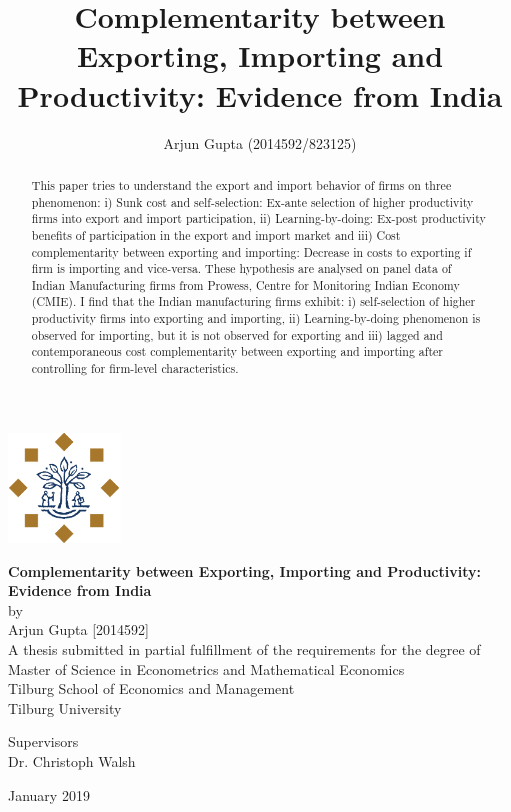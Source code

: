 \documentclass[12pt]{article}
\title{Complementarity between Exporting, Importing and Productivity: Evidence from India}
\author{Arjun Gupta (2014592/823125)}
\begin{document}

\begin{center}
\includegraphics[width=3cm]{./PICS/tilburg.png}
\bigskip
\bigskip
\bigskip
\bigskip

 \textbf{\Large Complementarity between Exporting, Importing and Productivity:
  Evidence from India}\\
\bigskip
\bigskip
by\\
Arjun Gupta [2014592]\\

\bigskip
\bigskip
\bigskip
\bigskip
 A thesis submitted in partial fulfillment of the requirements for the
 degree of Master of Science in Econometrics and Mathematical
 Economics \\
 \bigskip
\bigskip
\bigskip
\bigskip
 Tilburg School of Economics and Management\\
 Tilburg University\\
 \bigskip
\bigskip
\bigskip
\bigskip

Supervisors \\
Dr. Christoph Walsh\\
 \bigskip
\bigskip
\bigskip
\bigskip

January 2019

\maketitle
\end{center}

%  

\begin{abstract}
This paper tries to understand the export and import behavior of
firms on three phenomenon: i) Sunk cost and self-selection: Ex-ante selection of higher
productivity firms into export and import participation,
ii) Learning-by-doing: Ex-post productivity benefits of participation
in the export and import market and iii) Cost complementarity between exporting
and importing: Decrease in costs to exporting if firm is importing and
vice-versa. These hypothesis are analysed on panel data of Indian
Manufacturing firms from Prowess, Centre for Monitoring Indian Economy
(CMIE). I find that the Indian manufacturing firms exhibit: i) self-selection of higher productivity
firms into exporting and importing, ii) Learning-by-doing phenomenon
is observed for importing, but it is not observed for exporting and
iii) lagged and contemporaneous cost complementarity between exporting
and importing after controlling for firm-level characteristics.  
\end{abstract}
\bigskip
\end{document}
